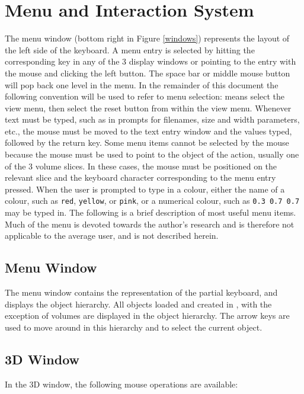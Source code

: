 \section{Menu and Interaction System}

The menu window (bottom right in Figure \ref{windows}) represents the layout
of the left side of the keyboard.  A menu entry is selected by hitting the
corresponding key in any of the 3 display windows or pointing to the entry
with the mouse and clicking the left button.  The space bar or middle mouse
button will pop back one level in the menu.  In the remainder of this document
the following convention will be used to refer to menu selection:
 means select the view menu, then select the reset button
from within the view menu.  Whenever text must be typed, such as in prompts
for filenames, size and width parameters, etc., the mouse must be moved to the
text entry window and the values typed, followed by the return key.
Some menu items cannot be selected by the mouse because the mouse must be
used to point to the object of the action, usually one of the 3 volume slices.
In these cases, the mouse must be positioned on the relevant slice and the
keyboard character corresponding to the menu entry pressed.
When the user is prompted to type in a colour, either the name of a colour,
such as {\tt red}, {\tt yellow}, or {\tt pink}, or a numerical colour,
such as \mbox{\tt 0.3 0.7 0.7} may be typed in.  The following is a brief
description of most useful menu items.  Much of the menu is devoted towards
the author's research and is therefore not applicable to the average 
user, and is not described herein.

\subsection{Menu Window}

The menu window contains the representation of the partial keyboard, and
displays the object hierarchy.  All objects loaded and created in \display,
with the exception of volumes are displayed in the object hierarchy.  The
arrow keys are used to move around in this hierarchy and to select the
current object.

\subsection{3D Window}

In the 3D window, the following mouse operations are available:

